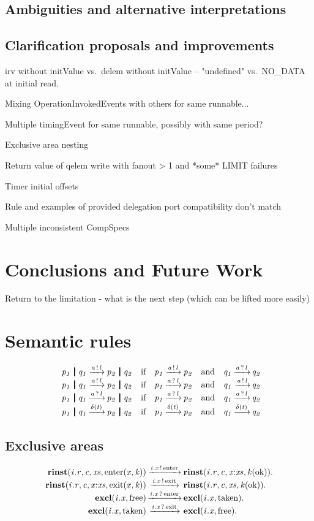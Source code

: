 \documentclass[twocolumn]{article}
\begin{document}
\subsection{Ambiguities and alternative interpretations}
\label{sec:DiscAmb}

\subsection{Clarification proposals and improvements}
\label{sec:DiscImp}

irv without initValue vs.\ delem without initValue -- "undefined" vs.\ NO\_DATA at initial read.

Mixing OperationInvokedEvents with others for same runnable...

Multiple timingEvent for same runnable, possibly with same period?

Exclusive area nesting

Return value of qelem write with fanout > 1 and *some* LIMIT failures

Timer initial offsets

Rule and examples of provided delegation port compatibility don't match

Multiple inconsistent CompSpecs


\section{Conclusions and Future Work}
\label{sec:Conc}

Return to the limitation - what is the next step (which can be lifted more easily)

\onecolumn
\appendix
\section{Semantic rules}
\label{sec:Prolog}


{
\renewcommand{\Prule}[2]{#1 & \Pif & #2\\}
\renewcommand{\Pcomma}{\quad\text{and}\quad}

\[ \begin{array}{r@{}c@{}lcr@{}c@{}l@{}r@{}c@{}l}  \CombRed  \end{array} \]
}
\subsection{Exclusive areas}
\[ \begin{array}{r@{}c@{}l}      \ExclusiveAreas          \end{array} \]
\end{document}
